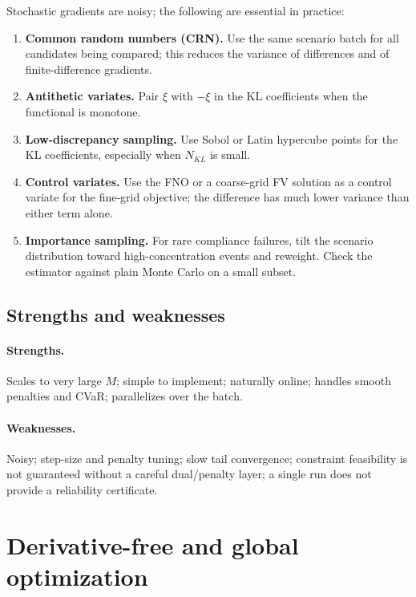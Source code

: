 \documentclass[11pt]{article}
\numberwithin{equation}{section}
\theoremstyle{plain}
\begin{document}
Stochastic gradients are noisy; the following are essential in practice:
\begin{enumerate}[leftmargin=1.6em,itemsep=2pt]
  \item \textbf{Common random numbers (CRN).}  Use the same scenario batch for
        all candidates being compared; this reduces the variance of
        differences and of finite-difference gradients.
  \item \textbf{Antithetic variates.}  Pair $\xi$ with $-\xi$ in the KL
        coefficients when the functional is monotone.
  \item \textbf{Low-discrepancy sampling.}  Use Sobol or Latin hypercube points
        for the KL coefficients, especially when $N_{KL}$ is small.
  \item \textbf{Control variates.}  Use the FNO or a coarse-grid FV solution as
        a control variate for the fine-grid objective; the difference has much
        lower variance than either term alone.
  \item \textbf{Importance sampling.}  For rare compliance failures, tilt the
        scenario distribution toward high-concentration events and reweight.
        Check the estimator against plain Monte Carlo on a small subset.
\end{enumerate}

\subsection{Strengths and weaknesses}

\paragraph{Strengths.}  Scales to very large $M$; simple to implement; naturally
online; handles smooth penalties and CVaR; parallelizes over the batch.

\paragraph{Weaknesses.}  Noisy; step-size and penalty tuning; slow tail
convergence; constraint feasibility is not guaranteed without a careful
dual/penalty layer; a single run does not provide a reliability certificate.

\section{Derivative-free and global optimization}
\label{sec:df}
\end{document}
